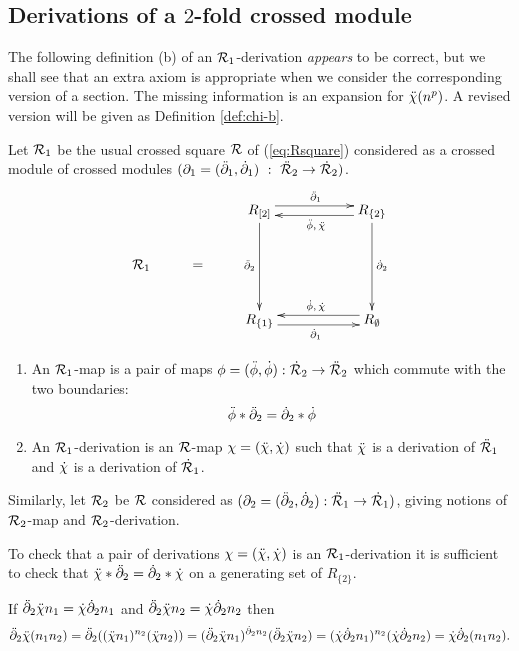 \subsection{Derivations of a $2$-fold crossed module} 
\label{subs:-der-xxmod}

The following definition (b) of an $\mathcal{R}_1$-derivation \emph{appears}
to be correct, but we shall see that an extra axiom is appropriate when 
we consider the corresponding version of a section.
The missing information is an expansion for $\ddot{\chi}(n^p)$.
A revised version will be given as Definition \ref{def:chi-b}.

\begin{defn} \label{def:chi-a}
Let ${\mathcal{R}_1}$ be the usual crossed square $\mathcal{R}$ of (\ref{eq:Rsquare}) 
considered as a crossed module of crossed modules  
$(\partial_1 = (\ddot{\partial}_1,\dot{\partial}_1) ~:~ \ddot{\mathcal{R}}_2 \to \dot{\mathcal{R}}_2)$.
\begin{equation} \label{eq:Rsqder}
\vcenter{\xymatrix{
        &   &    R_{[2]} \ar[rr] <+0.8ex>^{\ddbdyo} 
                         \ar[dd]_{\ddbdyt}
             &&  R_{\{2\}} \ar[ll] <+0.8ex>^{\ddph,\,\ddch} 
                           \ar[dd]^{\dbdyt} \\
\calR_1 & = &&&  \\
        &   &    R_{\{1\}} \ar[rr] <-0.8ex>_{\dbdyo}
             &&  R_{\emptyset} \ar[ll] <-0.8ex>_{\dph,\,\dch}
}} 
\end{equation}
\begin{enumerate}[\rm (a)]
\item 
An $\mathcal{R}_1$-map is a pair of maps 
$\phi = (\ddot{\phi}, \dot{\phi}) : \dot{\mathcal{R}}_2 \to \ddot{\mathcal{R}}_2$ which commute with the two 
boundaries:
$$ 
\ddot{\phi} \ast \ddot{\partial}_2 = \dot{\partial}_2 \ast \dot{\phi} 
$$
\item 
An $\mathcal{R}_1$-derivation is an $\mathcal{R}$-map $\chi = (\ddot{\chi}, \dot{\chi})$ 
such that $\ddot{\chi}$ is a derivation of $\ddot{\mathcal{R}}_1$ 
and $\dot{\chi}$ is a derivation of $\dot{\mathcal{R}}_1$.
\end{enumerate}

Similarly, let $\mathcal{R}_2$ be $\mathcal{R}$ considered as
$(\partial_2 = (\ddot{\partial}_2,\dot{\partial}_2) : \ddot{\mathcal{R}}_1 \to \dot{\mathcal{R}}_1)$,
giving notions of $\mathcal{R}_2$-map and $\mathcal{R}_2$-derivation.
\end{defn}

\begin{lem}
To check that a pair of derivations 
$\chi = (\ddot{\chi},\dot{\chi})$ is an $\mathcal{R}_1$-derivation
it is sufficient to check that $\ddot{\chi}\ast\ddot{\partial}_2 = \dot{\partial}_2\ast\dot{\chi}$
on a generating set of $R_{\{2\}}$.
\end{lem}
\begin{pf}
If $\ddot{\partial}_2\ddot{\chi} n_1 = \dot{\chi}\dot{\partial}_2 n_1$ 
and  $\ddot{\partial}_2\ddot{\chi} n_2 = \dot{\chi}\dot{\partial}_2 n_2$ then
$$
\ddot{\partial}_2\ddot{\chi}(n_1n_2)
= \ddot{\partial}_2((\ddot{\chi} n_1)^{n_2}(\ddot{\chi} n_2))
= (\ddot{\partial}_2\ddot{\chi} n_1)^{\dot{\partial}_2 n_2}(\ddot{\partial}_2\ddot{\chi} n_2)
= (\dot{\chi}\dot{\partial}_2 n_1)^{n_2}(\dot{\chi}\dot{\partial}_2 n_2)
= \dot{\chi}\dot{\partial}_2(n_1n_2).
$$ 
\end{pf}

